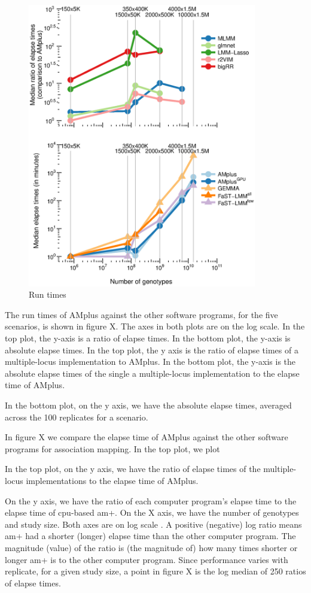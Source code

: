 \documentclass[12pt]{article}
\begin{document}
\begin{figure}
\label{fig_runtimes}
\caption{Run times}
\includegraphics[width=10cm]{time_memory}
\end{figure}

The run times of AMplus against the other software programs, for the five scenarios, is shown in figure X. 
The axes in both plots are on the log scale. In the top plot, the y-axis is a ratio of elapse times. In the bottom plot, 
the y-axis is absolute elapse times. 
 In the top plot,  the y axis is the ratio of elapse times of a multiple-locus implementation to 
AMplus. In the bottom plot, the y-axis is the absolute elapse times of the single 
a multiple-locus implementation to the elapse time of AMplus. 



In the bottom plot, on the y axis, we have the absolute elapse times, averaged 
across the 100 replicates for a scenario. 



In figure X we compare the elapse time of  AMplus against the other software programs for association mapping. 
In the top plot, we plot 


In the top plot, on the y axis, we have the ratio of elapse times of the multiple-locus implementations to the elapse time of AMplus. 


On the y axis, we have the ratio of each computer program's elapse time to the elapse time of cpu-based am+. On the X axis, we have the number of genotypes and study size. Both axes are on log scale . A positive (negative) log ratio means am+ had a shorter (longer) elapse time  than the other computer program. The magnitude (value) of the ratio is (the magnitude of)  how many times shorter or longer am+ is to the other computer program.  Since performance varies with replicate, for a given study size, a point in figure X is the log median of 250  ratios of elapse times.
\end{document}
